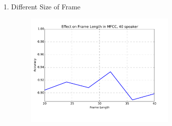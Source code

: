 \begin{enumerate}
  \item Different Size of Frame
    \begin{figure}[H]
      \centering
      \includegraphics[width=0.7\textwidth]{img/mfcc-frame-len.pdf}
    \end{figure}
\end{enumerate}

